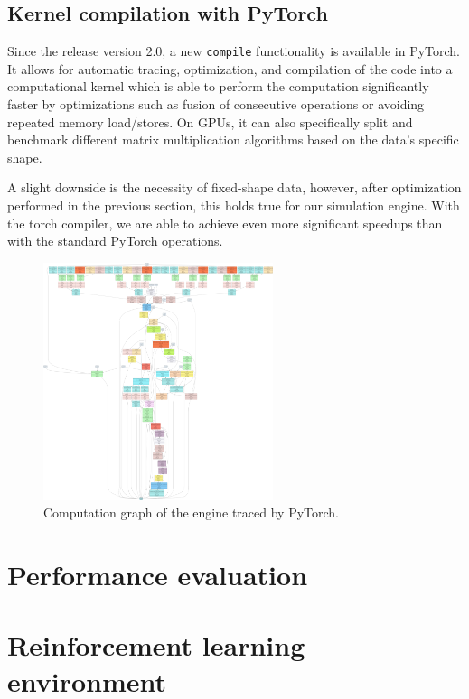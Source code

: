 \documentclass[a4paper,12pt]{article}
\begin{document}
\subsection{Kernel compilation with PyTorch}
Since the release version 2.0, a new \texttt{compile} functionality is available in PyTorch. It allows for automatic tracing, optimization, and compilation of the code into a computational kernel which is able to perform the computation significantly faster by optimizations such as fusion of consecutive operations or avoiding repeated memory load/stores. On GPUs, it can also specifically split and benchmark different matrix multiplication algorithms based on the data's specific shape.

A slight downside is the necessity of fixed-shape data, however, after optimization performed in the previous section, this holds true for our simulation engine. With the torch compiler, we are able to achieve even more significant speedups than with the standard PyTorch operations.

\begin{figure}[H]
  \centering
  \includegraphics[width=0.6\textwidth]{fig/graph_diagram.pdf}
  \caption{Computation graph of the engine traced by PyTorch.}
  \label{fig:speedup}
\end{figure}

\clearpage

\section{Performance evaluation}

\clearpage

\section{Reinforcement learning environment}
\end{document}
